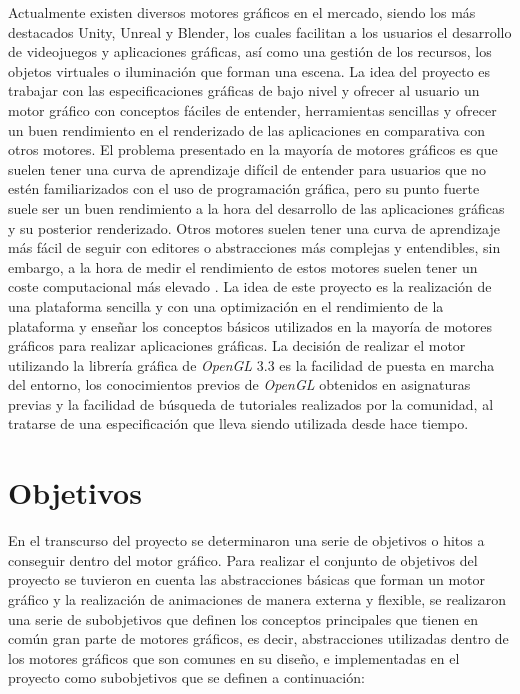 \documentclass[a4paper]{book}
\begin{document}

Actualmente existen diversos motores gráficos en el mercado, siendo los más destacados Unity, Unreal y Blender,
los cuales facilitan a los usuarios el desarrollo de videojuegos y aplicaciones gráficas, así como una gestión
de los recursos, los objetos virtuales o iluminación que forman una escena. La idea del proyecto es trabajar con las 
especificaciones gráficas de bajo nivel y ofrecer al usuario un motor gráfico con conceptos fáciles de entender, herramientas
sencillas y ofrecer un buen rendimiento en el renderizado de las aplicaciones en comparativa con otros motores.
El problema presentado en la mayoría de motores gráficos es que suelen tener una curva de aprendizaje difícil
de entender para usuarios que no estén familiarizados con el uso de programación gráfica, pero su punto fuerte
suele ser un buen rendimiento a la hora del desarrollo de las aplicaciones gráficas y su posterior renderizado.
Otros motores suelen tener una curva de aprendizaje más fácil de seguir con editores o abstracciones más complejas y entendibles,
sin embargo, a la hora de medir el rendimiento de estos motores suelen tener un coste computacional más elevado \cite{unreal:_vsunity}.
La idea de este proyecto es la realización de una plataforma sencilla y con una optimización en el rendimiento de la
plataforma y enseñar los conceptos básicos utilizados en la mayoría de motores gráficos para realizar aplicaciones gráficas.
La decisión de realizar el motor utilizando la librería gráfica de \textit{OpenGL} 3.3 es la facilidad de puesta en marcha del
entorno, los conocimientos previos de \textit{OpenGL} obtenidos en asignaturas previas y la facilidad de búsqueda de tutoriales
realizados por la comunidad, al tratarse de una especificación que lleva siendo utilizada desde hace tiempo.

\section{Objetivos}
\label{sec:objetivo-general}

En el transcurso del proyecto se determinaron una serie de objetivos o hitos a conseguir dentro del motor gráfico.
Para realizar el conjunto de objetivos del proyecto se tuvieron en cuenta las abstracciones básicas que forman
un motor gráfico y la realización de animaciones de manera externa y flexible, se realizaron una serie de
subobjetivos que definen los conceptos principales que tienen en común gran parte de motores gráficos, es decir,
abstracciones utilizadas dentro de los motores gráficos que son comunes en su diseño, e implementadas en el
proyecto como subobjetivos que se definen a continuación:
\end{document}

